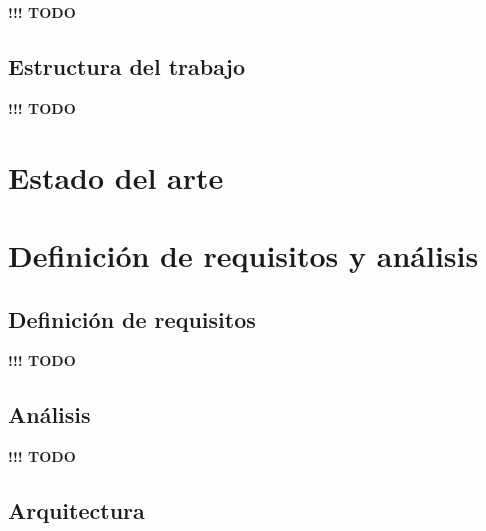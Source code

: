\documentclass[]{article}
\begin{document}

\textbf{!!! TODO}

\subsection{Estructura del trabajo}


\textbf{!!! TODO}


\newpage
\section{Estado del arte}




\newpage
\section{Definición de requisitos y análisis}


\subsection{Definición de requisitos}


\textbf{!!! TODO}

\subsection{Análisis}


\textbf{!!! TODO}

\subsection{Arquitectura}
\end{document}

